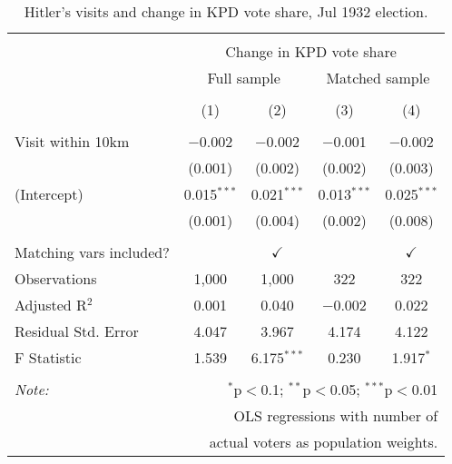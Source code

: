 
\begin{table}[!htbp] \centering 
  \caption{Hitler's visits and change in KPD vote share, Jul 1932 election.} 
  \label{tab:ols-d_p_kpd-2} 
\begin{tabular}{@{\extracolsep{5pt}}lcccc} 
\\[-1.8ex]\hline 
\hline \\[-1.8ex] 
 & \multicolumn{4}{c}{Change in KPD vote share} \\ 
\cline{2-5} 
 & \multicolumn{2}{c}{Full sample} & \multicolumn{2}{c}{Matched sample} \\ 
\\[-1.8ex] & (1) & (2) & (3) & (4)\\ 
\hline \\[-1.8ex] 
 Visit within 10km & $-$0.002 & $-$0.002 & $-$0.001 & $-$0.002 \\ 
  & (0.001) & (0.002) & (0.002) & (0.003) \\ 
  (Intercept) & 0.015$^{***}$ & 0.021$^{***}$ & 0.013$^{***}$ & 0.025$^{***}$ \\ 
  & (0.001) & (0.004) & (0.002) & (0.008) \\ 
 \hline \\[-1.8ex] 
Matching vars included? &  & \multicolumn{1}{c}{$\checkmark$} &  & \multicolumn{1}{c}{$\checkmark$} \\ 
Observations & 1,000 & 1,000 & 322 & 322 \\ 
Adjusted R$^{2}$ & 0.001 & 0.040 & $-$0.002 & 0.022 \\ 
Residual Std. Error & 4.047 & 3.967 & 4.174 & 4.122 \\ 
F Statistic & 1.539 & 6.175$^{***}$ & 0.230 & 1.917$^{*}$ \\ 
\hline 
\hline \\[-1.8ex] 
\textit{Note:}  & \multicolumn{4}{r}{$^{*}$p$<$0.1; $^{**}$p$<$0.05; $^{***}$p$<$0.01} \\ 
 & \multicolumn{4}{r}{OLS regressions with number of} \\ 
 & \multicolumn{4}{r}{actual voters as population weights.} \\ 
\end{tabular} 
\end{table} 
